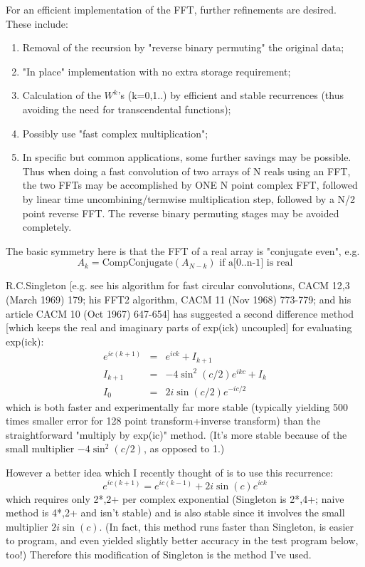 For an efficient implementation of the FFT, further refinements are desired.
These include: 
\begin{enumerate}
\item Removal of the recursion by "reverse binary permuting" the
original data; 
\item "In place" implementation with no extra storage requirement;
\item Calculation of the $W^k$'s (k=0,1..) by efficient and stable recurrences
(thus avoiding the need for transcendental functions); 
\item Possibly use "fast complex multiplication"; 
\item In specific but common applications,
some further savings may be possible. Thus when doing a fast convolution
of two arrays of N reals using an FFT, the two FFTs may be 
accomplished by ONE N point complex FFT, 
followed by linear time uncombining/termwise
multiplication step, followed by a N/2 point reverse FFT. 
The reverse binary
permuting stages may be avoided completely. 
\end{enumerate}

The basic symmetry here is that
the FFT of a real array is "conjugate even", e.g.
\begin{equation}
    A_k = \mbox{CompConjugate}(A_{N-k}) \mbox{ if a[0..n-1] is real}
\end{equation}

R.C.Singleton [e.g. see his algorithm for fast circular convolutions,
CACM 12,3 (March 1969) 179; his FFT2 algorithm, CACM 11 (Nov 1968) 773-779;
and his article CACM 10 (Oct 1967) 647-654] has suggested a second 
difference
method [which keeps the real and imaginary parts of exp(ick) uncoupled] 
for evaluating exp(ick):    
\begin{eqnarray}
    e^{ic(k+1)} & = & e^{ick} + I_{k+1}\\
    I_{k+1} & = & -4 \sin^2(c/2) e^{ikc} + I_k\\   
    I_0 & = & 2 i \sin(c/2) e^{-ic/2}
\end{eqnarray}
which is both faster and experimentally far more stable (typically
yielding 500 times smaller error for 128 point transform+inverse transform)
than the straightforward "multiply by exp(ic)" method. (It's more stable
because of the small multiplier $-4 \sin^2(c/2)$, as opposed to 1.)

However a better idea which I recently thought of is to use this recurrence:
\begin{equation}
    e^{ic(k+1)} = e^{ic(k-1)} + 2 i \sin(c) e^{ick}
\end{equation}
which requires only 2*,2+ per complex exponential (Singleton is 2*,4+;
naive method is 4*,2+ and isn't stable) and is also stable since it involves
the small multiplier $2 i \sin(c)$. (In fact, this method runs faster than
Singleton, is easier to program, and even yielded slightly better accuracy
in the test program below, too!) Therefore this modification of Singleton
is the method I've used.

